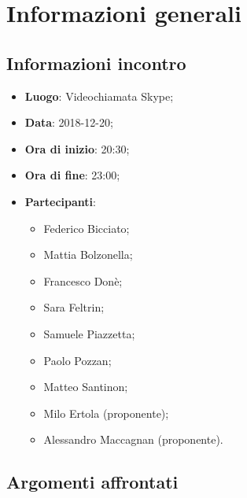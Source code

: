 \section{Informazioni generali}

\subsection{Informazioni incontro}
\begin{itemize}
\item \textbf{Luogo}: Videochiamata Skype;
\item \textbf{Data}: 2018-12-20;
\item \textbf{Ora di inizio}: 20:30;
\item \textbf{Ora di fine}: 23:00;
\item \textbf{Partecipanti}: 
	\begin{itemize}
		\item Federico Bicciato;
		\item Mattia Bolzonella;
		\item Francesco Donè;
		\item Sara Feltrin;
		\item Samuele Piazzetta;
		\item Paolo Pozzan;
		\item Matteo Santinon;
		\item Milo Ertola (proponente);
		\item Alessandro Maccagnan (proponente).
	\end{itemize}
\end{itemize}

\subsection{Argomenti affrontati}

